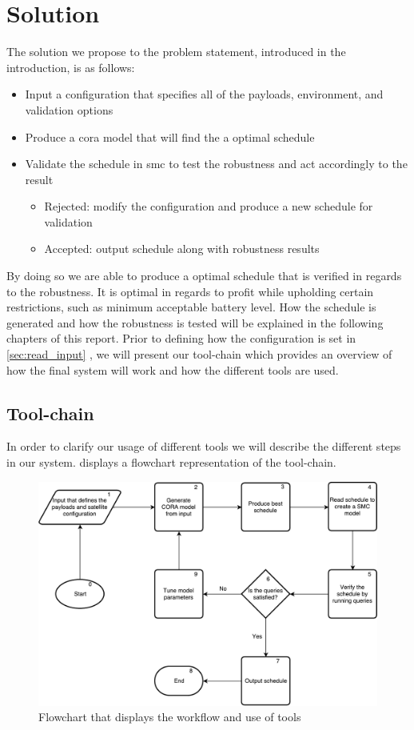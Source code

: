 \section{Solution} \label{sec:solution}
The solution we propose to the problem statement, introduced in the introduction, is as follows:
\begin{itemize}
	\item	Input a configuration that specifies all of the payloads, environment, and validation options
	\item	Produce a \gls{cora} model that will find the a optimal schedule
	\item	Validate the schedule in \gls{smc} to test the robustness and act accordingly to the result
	\begin{itemize}
		\item	Rejected: modify the configuration and produce a new schedule for validation
		\item	Accepted: output schedule along with robustness results
	\end{itemize}
\end{itemize}

By doing so we are able to produce a optimal schedule that is verified in regards to the robustness.
It is optimal in regards to profit while upholding certain restrictions, such as minimum acceptable battery level.
How the schedule is generated and how the robustness is tested will be explained in the following chapters of this report.
Prior to defining how the configuration is set in \cref{sec:read_input} , we will present our tool-chain which provides an overview of how the final system will work and how the different tools are used.

\subsection{Tool-chain} \label{subsec:tool_chainv}
In order to clarify our usage of different tools we will describe the different steps in our system. 
 displays a flowchart representation of the tool-chain.

\begin{figure}[h]
	\includegraphics[width=\textwidth]{graphics/flow_final.pdf}
	\caption{Flowchart that displays the workflow and use of tools}
	\label{fig:tool1}
\end{figure}

